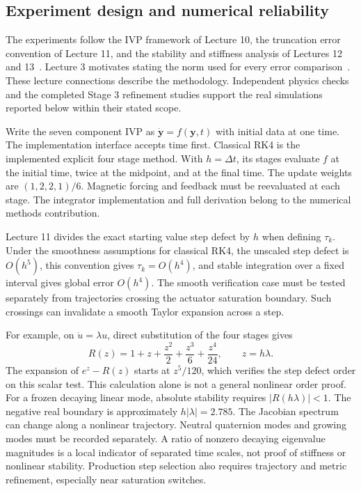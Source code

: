 \subsection{Experiment design and numerical reliability}
The experiments follow the IVP framework of Lecture 10, the truncation
error convention of Lecture 11, and the stability and stiffness analysis
of Lectures 12 and 13~\cite{ae370lecture10,ae370lecture11,ae370lecture12,ae370lecture13}.
Lecture 3 motivates stating the norm used for every error comparison~\cite{ae370lecture3}. These lecture connections describe the methodology.
Independent physics checks and the completed Stage 3 refinement studies
support the real simulations reported below within their stated scope.

Write the seven component IVP as $\dot{\mathbf y}=f(\mathbf y,t)$ with
initial data at one time. The implementation interface accepts time first.
Classical RK4 is the implemented explicit four stage method. With
$h=\Delta t$, its stages evaluate $f$ at the initial time, twice at the
midpoint, and at the final time. The update weights are
$(1,2,2,1)/6$. Magnetic forcing and feedback must be reevaluated at each
stage. The integrator implementation and full derivation belong to the
numerical methods contribution.

Lecture 11 divides the exact starting value step defect by $h$ when defining
$\tau_k$. Under the smoothness assumptions for classical RK4, the unscaled
step defect is $O(h^5)$, this convention gives $\tau_k=O(h^4)$, and stable
integration over a fixed interval gives global error $O(h^4)$. The smooth
verification case must be tested separately from trajectories crossing the
actuator saturation boundary. Such crossings can invalidate a smooth
Taylor expansion across a step.

For example, on $\dot u=\lambda u$, direct substitution of the four stages
gives
\[
 R(z)=1+z+\frac{z^2}{2}+\frac{z^3}{6}+\frac{z^4}{24},
 \qquad z=h\lambda.
\]
The expansion of $e^z-R(z)$ starts at $z^5/120$, which verifies the step
defect order on this scalar test. This calculation alone is not a general
nonlinear order proof. For a frozen decaying linear mode, absolute stability
requires $|R(h\lambda)|<1$. The negative real boundary is approximately
$h|\lambda|=2.785$. The Jacobian spectrum can change along a nonlinear
trajectory. Neutral quaternion modes and growing modes must be recorded
separately. A ratio of nonzero decaying eigenvalue magnitudes is a local
indicator of separated time scales, not proof of stiffness or nonlinear
stability. Production step selection also requires trajectory and metric
refinement, especially near saturation switches.


